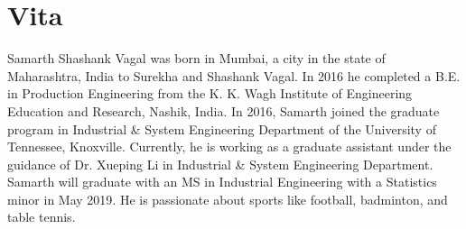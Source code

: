 \chapter*{Vita} \label{ch:vita}
Samarth Shashank Vagal was born in Mumbai, a city in the state of Maharashtra, India to Surekha and Shashank Vagal. In 2016 he completed a B.E. in Production Engineering from the K. K. Wagh Institute of Engineering Education and Research, Nashik, India. In 2016, Samarth joined the graduate program in Industrial \& System Engineering Department of the University of Tennessee, Knoxville. Currently, he is working as a graduate assistant under the guidance of Dr. Xueping Li in Industrial \& System Engineering Department. Samarth will graduate with an MS in Industrial Engineering with a Statistics minor in May 2019. He is passionate about sports like football, badminton, and table tennis.